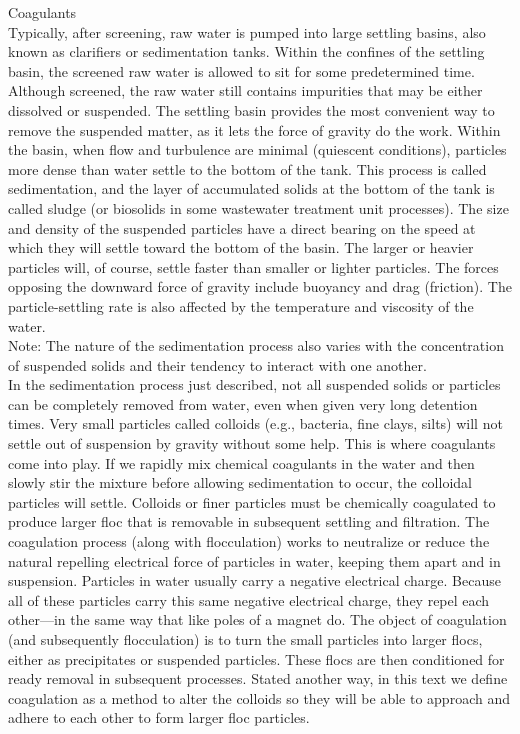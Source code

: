Coagulants\\
Typically, after screening, raw water is pumped into large settling basins, also known as clarifiers or sedimentation tanks. Within the confines of the settling basin, the screened raw water is allowed to sit for some predetermined time. Although screened, the raw water still contains impurities that may be either dissolved or suspended. The settling basin provides the most convenient way to remove the suspended matter, as it lets the force of gravity do the work. Within the basin, when flow and turbulence are minimal (quiescent conditions), particles more dense than water settle to the bottom of the tank. This process is called sedimentation, and the layer of accumulated solids at the bottom of the tank is called sludge (or biosolids in some wastewater treatment unit processes). The size and density of the suspended particles have a direct bearing on the speed at which they will settle toward the bottom of the basin. The larger or heavier particles will, of course, settle faster than smaller or lighter particles. The forces opposing the downward force of gravity include buoyancy and drag (friction). The particle-settling rate is also affected by the temperature and viscosity of the water.\\
Note: The nature of the sedimentation process also varies with the concentration of suspended solids and their tendency to interact with one another.\\
In the sedimentation process just described, not all suspended solids or particles can be completely removed from water, even when given very long detention times. Very small particles called colloids (e.g., bacteria, fine clays, silts) will not settle out of suspension by gravity without some help. This is where coagulants come into play. If we rapidly mix chemical coagulants in the water and then slowly stir the mixture before allowing sedimentation to occur, the colloidal particles will settle. Colloids or finer particles must be chemically coagulated to produce larger floc that is removable in subsequent settling and filtration.
The coagulation process (along with flocculation) works to neutralize or reduce the natural repelling electrical force of particles in water, keeping them apart and in suspension. Particles in water usually carry a negative electrical charge. Because all of these particles carry this same negative electrical charge, they repel each other—in the same way that like poles of a magnet do. The object of coagulation (and subsequently flocculation) is to turn the small particles into larger flocs, either as precipitates or suspended particles. These flocs are then conditioned for ready removal in subsequent processes. Stated another way, in this text we define coagulation as a method to alter the colloids so they will be able to approach and adhere to each other to form larger floc particles.\\
